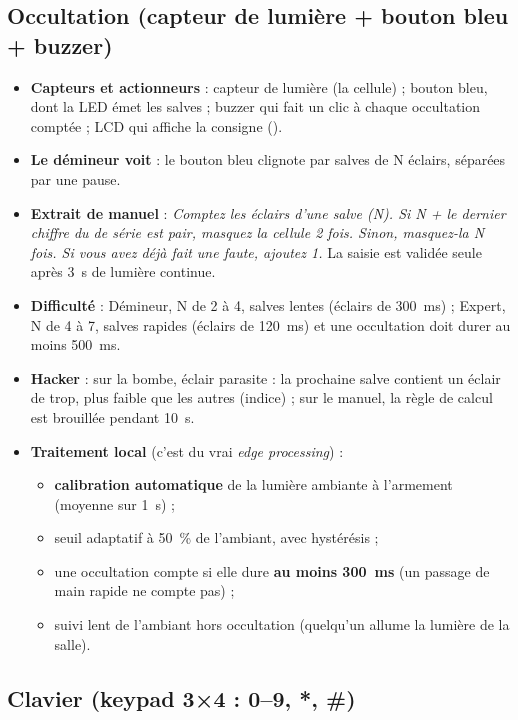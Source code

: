 \documentclass[11pt,a4paper]{article}
\newcommand{\code}[1]{\texttt{\detokenize{#1}}}
\begin{document}
\subsection{Occultation (capteur de lumière + bouton bleu + buzzer)}
\label{sec:occultation}

\begin{itemize}
  \item \textbf{Capteurs et actionneurs} : capteur de lumière (la \og cellule\fg{}) ; bouton bleu, dont la LED émet les salves ; buzzer qui fait un clic à chaque occultation comptée ; LCD qui affiche la consigne (\code{OCCULTATION}).
  \item \textbf{Le démineur voit} : le bouton bleu clignote par salves de N éclairs, séparées par une pause.
  \item \textbf{Extrait de manuel} : \emph{\og Comptez les éclairs d'une salve (N). Si N + le dernier chiffre du \no{} de série est pair, masquez la cellule 2 fois. Sinon, masquez-la N fois. Si vous avez déjà fait une faute, ajoutez 1.\fg{}} La saisie est validée seule après 3~s de lumière continue.
  \item \textbf{Difficulté} : Démineur, N de 2 à 4, salves lentes (éclairs de 300~ms) ; Expert, N de 4 à 7, salves rapides (éclairs de 120~ms) et une occultation doit durer au moins 500~ms.
  \item \textbf{Hacker} : sur la bombe, \og éclair parasite\fg{} : la prochaine salve contient un éclair de trop, plus faible que les autres (indice) ; sur le manuel, la règle de calcul est brouillée pendant 10~s.
  \item \textbf{Traitement local} (c'est du vrai \emph{edge processing}) :
  \begin{itemize}
    \item \textbf{calibration automatique} de la lumière ambiante à l'armement (moyenne sur 1~s) ;
    \item seuil adaptatif à 50~\% de l'ambiant, avec hystérésis ;
    \item une occultation compte si elle dure \textbf{au moins 300~ms} (un passage de main rapide ne compte pas) ;
    \item suivi lent de l'ambiant hors occultation (quelqu'un allume la lumière de la salle).
  \end{itemize}
\end{itemize}

\subsection{Clavier (keypad 3×4 : 0--9, *, \#)}
\label{sec:clavier}
\end{document}
